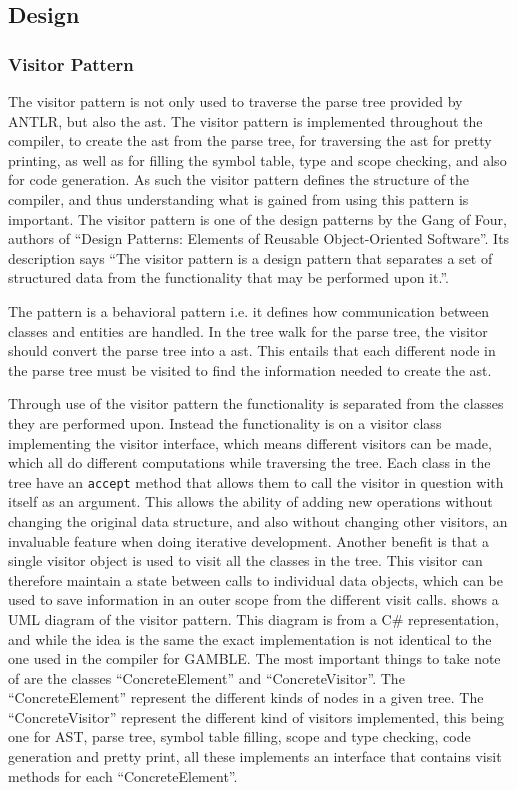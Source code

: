 \subsection{Design}
\subsubsection*{Visitor Pattern}\label{subs:visit}
The visitor pattern is not only used to traverse the parse tree provided by ANTLR, but also the \acrfull{ast}.
The visitor pattern is implemented throughout the compiler, to create the \acrshort{ast} from the parse tree, for traversing the \acrshort{ast} for pretty printing, as well as for filling the symbol table, type and scope checking, and also for code generation.
As such the visitor pattern defines the structure of the compiler, and thus understanding what is gained from using this pattern is important.
The visitor pattern is one of the design patterns by the Gang of Four, authors of ``Design Patterns: Elements of Reusable Object-Oriented Software''.
Its description says ``The visitor pattern is a design pattern that separates a set of structured data from the functionality that may be performed upon it.''. \citep{GOF}

The pattern is a behavioral pattern i.e. it defines how communication between classes and entities are handled.
In the tree walk for the parse tree, the visitor should convert the parse tree into a \acrshort{ast}.
This entails that each different node in the parse tree must be visited to find the information needed to create the \acrshort{ast}.

Through use of the visitor pattern the functionality is separated from the classes they are performed upon. 
Instead the functionality is on a visitor class implementing the visitor interface, which means different visitors can be made, which all do different computations while traversing the tree.
Each class in the tree have an \texttt{accept} method that allows them to call the visitor in question with itself as an argument.
This allows the ability of adding new operations without changing the original data structure, and also without changing other visitors, an invaluable feature when doing iterative development.
Another benefit is that a single visitor object is used to visit all the classes in the tree.
This visitor can therefore maintain a state between calls to individual data objects, which can be used to save information in an outer scope from the different visit calls.
 shows a UML diagram of the visitor pattern.
This diagram is from a C\# representation, and while the idea is the same the exact implementation is not identical to the one used in the compiler for GAMBLE.
The most important things to take note of are the classes ``ConcreteElement'' and ``ConcreteVisitor''.
The ``ConcreteElement'' represent the different kinds of nodes in a given tree.
The ``ConcreteVisitor'' represent the different kind of visitors implemented, this being one for AST, parse tree, symbol table filling, scope and type checking, code generation and pretty print, all these implements an interface that contains visit methods for each ``ConcreteElement''.

